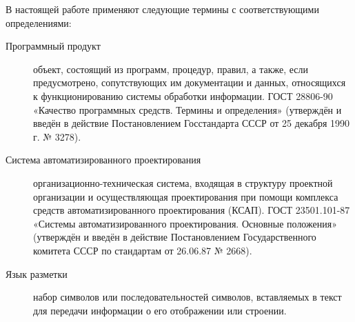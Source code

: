 \Defines %

В настоящей работе применяют следующие термины с соответствующими определениями:

\begin{description}

\item[Программный продукт] объект, состоящий из программ, процедур, правил, а также, если предусмотрено, сопутствующих им документации и данных, относящихся к функционированию системы обработки информации. ГОСТ 28806-90 «Качество программных средств. Термины и определения» (утверждён и введён в действие Постановлением Госстандарта СССР от 25 декабря 1990 г. № 3278).

\item[Система автоматизированного проектирования] организационно-техническая система, входящая в структуру проектной организации и осуществляющая проектирования при помощи комплекса средств автоматизированного проектирования (КСАП). ГОСТ 23501.101-87 «Системы автоматизированного проектирования. Основные положения» (утверждён и введён в действие Постановлением Государственного комитета СССР по стандартам от 26.06.87 № 2668).

\item[Язык разметки] набор символов или последовательностей символов, вставляемых в текст для передачи информации о его отображении или строении.

\end{description}

